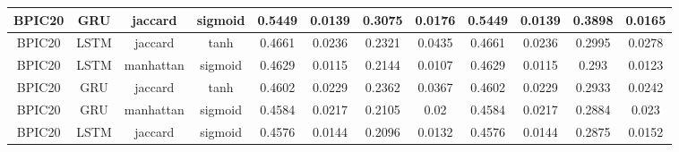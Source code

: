 \documentclass{article}%
\begin{document}
\begin{tabular}{|c|c|c|c|c|c|c|c|c|c|c|c|}
\hline%
BPIC20&GRU&jaccard&sigmoid&0.5449&0.0139&0.3075&0.0176&0.5449&0.0139&0.3898&0.0165\\%
\hline%
BPIC20&LSTM&jaccard&tanh&0.4661&0.0236&0.2321&0.0435&0.4661&0.0236&0.2995&0.0278\\%
\hline%
BPIC20&LSTM&manhattan&sigmoid&0.4629&0.0115&0.2144&0.0107&0.4629&0.0115&0.293&0.0123\\%
\hline%
BPIC20&GRU&jaccard&tanh&0.4602&0.0229&0.2362&0.0367&0.4602&0.0229&0.2933&0.0242\\%
\hline%
BPIC20&GRU&manhattan&sigmoid&0.4584&0.0217&0.2105&0.02&0.4584&0.0217&0.2884&0.023\\%
\hline%
BPIC20&LSTM&jaccard&sigmoid&0.4576&0.0144&0.2096&0.0132&0.4576&0.0144&0.2875&0.0152\\%
\hline%
\end{tabular}

%
\newpage%
\end{document}
